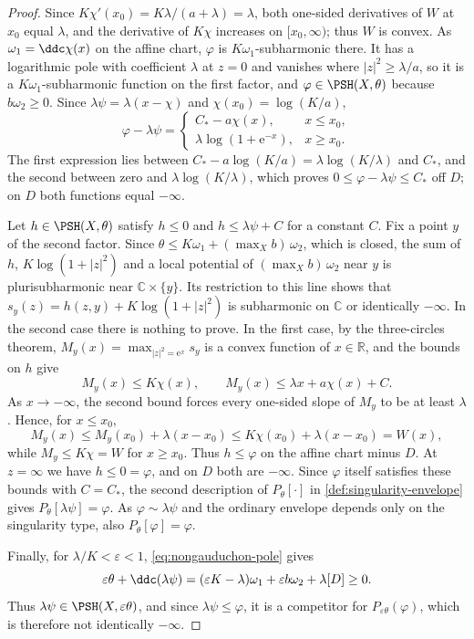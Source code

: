 \begin{proof}
Since $K\chi'(x_0)=K\lambda/(a+\lambda)=\lambda$, both one-sided derivatives of $W$ at $x_0$ equal $\lambda$, and the derivative of $K\chi$ increases on $[x_0,\infty)$; thus $W$ is convex. As $\omega_1=\ddc\chi(x)$ on the affine chart, $\varphi$ is $K\omega_1$-subharmonic there. It has a logarithmic pole with coefficient $\lambda$ at $z=0$ and vanishes where $|z|^2\geq\lambda/a$, so it is a $K\omega_1$-subharmonic function on the first factor, and $\varphi\in\PSH(X,\theta)$ because $b\omega_2\geq0$. Since $\lambda\psi=\lambda(x-\chi)$ and $\chi(x_0)=\log(K/a)$,
\[
 \varphi-\lambda\psi=
 \begin{cases}
 C_*-a\chi(x),&x\leq x_0,\\
 \lambda\log(1+\mathrm e^{-x}),&x\geq x_0.
 \end{cases}
\]
The first expression lies between $C_*-a\log(K/a)=\lambda\log(K/\lambda)$ and $C_*$, and the second between zero and $\lambda\log(K/\lambda)$, which proves $0\leq\varphi-\lambda\psi\leq C_*$ off $D$; on $D$ both functions equal $-\infty$.

Let $h\in\PSH(X,\theta)$ satisfy $h\leq0$ and $h\leq\lambda\psi+C$ for a constant $C$. Fix a point $y$ of the second factor. Since $\theta\leq K\omega_1+(\max_Xb)\,\omega_2$, which is closed, the sum of $h$, $K\log(1+|z|^2)$ and a local potential of $(\max_Xb)\,\omega_2$ near $y$ is plurisubharmonic near $\mathbb C\times\{y\}$. Its restriction to this line shows that $s_y(z)=h(z,y)+K\log(1+|z|^2)$ is subharmonic on $\mathbb C$ or identically $-\infty$. In the second case there is nothing to prove. In the first case, by the three-circles theorem, $M_y(x)=\max_{|z|^2=\mathrm e^x}s_y$ is a convex function of $x\in\mathbb R$, and the bounds on $h$ give
\[
 M_y(x)\leq K\chi(x),\qquad M_y(x)\leq\lambda x+a\chi(x)+C.
\]
As $x\to-\infty$, the second bound forces every one-sided slope of $M_y$ to be at least $\lambda$. Hence, for $x\leq x_0$,
\[
 M_y(x)\leq M_y(x_0)+\lambda(x-x_0)\leq K\chi(x_0)+\lambda(x-x_0)=W(x),
\]
while $M_y\leq K\chi=W$ for $x\geq x_0$. Thus $h\leq\varphi$ on the affine chart minus $D$. At $z=\infty$ we have $h\leq0=\varphi$, and on $D$ both are $-\infty$. Since $\varphi$ itself satisfies these bounds with $C=C_*$, the second description of $P_\theta[\cdot]$ in \cref{def:singularity-envelope} gives $P_\theta[\lambda\psi]=\varphi$. As $\varphi\sim\lambda\psi$ and the ordinary envelope depends only on the singularity type, also $P_\theta[\varphi]=\varphi$.

Finally, for $\lambda/K<\varepsilon<1$, \eqref{eq:nongauduchon-pole} gives
\[
 \varepsilon\theta+\ddc(\lambda\psi)
 =(\varepsilon K-\lambda)\omega_1+\varepsilon b\omega_2+\lambda[D]\geq0.
\]
Thus $\lambda\psi\in\PSH(X,\varepsilon\theta)$, and since $\lambda\psi\leq\varphi$, it is a competitor for $P_{\varepsilon\theta}(\varphi)$, which is therefore not identically $-\infty$.
\end{proof}

